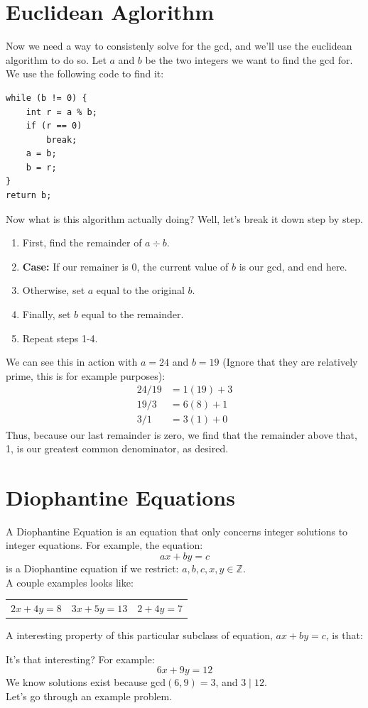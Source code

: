 \documentclass[10pt,oneside]{book}
\newcommand{\Z}{\mathbb{Z}}\newcommand{\R}{\mathbb{R}}\newcommand{\N}{\mathbb{N}}
\newcommand{\n}{\vspace{0.15cm}\\}
\newcommand{\centerit}[1]{{\begin{center} #1 \end{center}}}
\begin{document}
\pagebreak
\section*{Euclidean Aglorithm}
Now we need a way to consistenly solve for the gcd, and we'll use the euclidean algorithm to do so. Let $a$ and $b$ be the two integers we want to find the gcd for. We use the following code to find it:
\begin{verbatim}
while (b != 0) {
    int r = a % b;
    if (r == 0)
        break;
    a = b;
    b = r;
}
return b;
\end{verbatim} 
Now what is this algorithm actually doing? Well, let's break it down step by step. 
\begin{enumerate}[itemsep=0pt]
    \item First, find the remainder of $a \div b$. 
    \item \textbf{Case: }If our remainer is 0, the current value of $b$ is our gcd, and end here.
    \item Otherwise, set $a$ equal to the original $b$.
    \item Finally, set $b$ equal to the remainder.
    \item Repeat steps 1-4.
\end{enumerate}
We can see this in action with $a = 24$ and $b = 19$ (Ignore that they are relatively prime, this is for example purposes):
\begin{align*}
    24 / 19 &= 1(19) + 3\\
    19 / 3 &= 6(8) + 1\\
    3 / 1 &= 3(1) + 0
\end{align*}
Thus, because our last remainder is zero, we find that the remainder above that, 1, is our greatest common denominator, as desired. 

\section*{Diophantine Equations}
A Diophantine Equation is an equation that only concerns integer solutions to integer equations. For example, the equation:
\[ax+by =c\]
is a Diophantine equation if we restrict: $a,b,c,x,y\in \Z$. \n
A couple examples looks like:
\centerit{
    \begin{tabular}{c c c}
        $2x+4y =8$ & $3x + 5y = 13$ & $2 + 4y = 7$ 
    \end{tabular}
}
A interesting property of this particular subclass of equation, $ax + by = c$, is that:
\begin{center}
\end{center}
It's that interesting? For example:
\[6x + 9y = 12\]
We know solutions exist because gcd$(6, 9) = 3$, and $3\mid 12$.\n
Let's go through an example problem.
\end{document}
